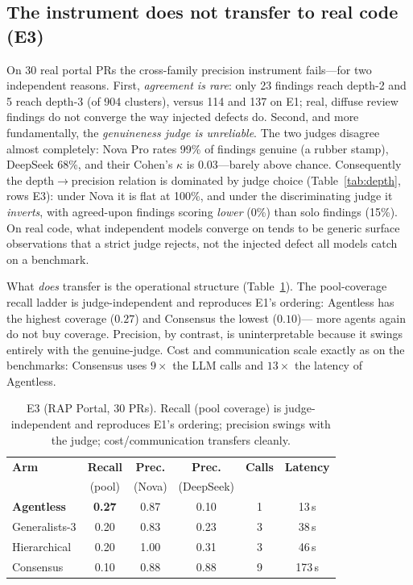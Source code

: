 \documentclass[conference]{IEEEtran}
\begin{document}
\subsection{The instrument does not transfer to real code (E3)}
On 30 real portal PRs the cross-family precision instrument fails---for two
independent reasons. First, \emph{agreement is rare}: only 23 findings reach
depth-2 and 5 reach depth-3 (of 904 clusters), versus 114 and 137 on E1; real,
diffuse review findings do not converge the way injected defects do. Second, and
more fundamentally, the \emph{genuineness judge is unreliable}. The two judges
disagree almost completely: Nova Pro rates 99\% of findings genuine (a rubber
stamp), DeepSeek 68\%, and their Cohen's $\kappa$ is $0.03$---barely above
chance. Consequently the depth$\rightarrow$precision relation is dominated by
judge choice (Table~\ref{tab:depth}, rows E3): under Nova it is flat at 100\%,
and under the discriminating judge it \emph{inverts}, with agreed-upon findings
scoring \emph{lower} (0\%) than solo findings (15\%). On real code, what
independent models converge on tends to be generic surface observations that a
strict judge rejects, not the injected defect all models catch on a benchmark.

What \emph{does} transfer is the operational structure (Table~\ref{tab:e3}). The
pool-coverage recall ladder is judge-independent and reproduces E1's ordering:
Agentless has the highest coverage ($0.27$) and Consensus the lowest ($0.10$)---
more agents again do not buy coverage. Precision, by contrast, is uninterpretable
because it swings entirely with the genuine-judge. Cost and communication scale
exactly as on the benchmarks: Consensus uses $9\times$ the LLM calls and
$13\times$ the latency of Agentless.

\begin{table}[t]
\caption{E3 (RAP Portal, 30 PRs). Recall (pool coverage) is judge-independent and
reproduces E1's ordering; precision swings with the judge; cost/communication
transfers cleanly.}
\label{tab:e3}
\centering
\small
\begin{tabular}{@{}lccccc@{}}
\toprule
\textbf{Arm} & \textbf{Recall} & \textbf{Prec.} & \textbf{Prec.} & \textbf{Calls} & \textbf{Latency} \\
 & (pool) & (Nova) & (DeepSeek) & & \\
\midrule
\textbf{Agentless} & \textbf{0.27} & 0.87 & 0.10 & 1 & 13\,s \\
Generalists-3 & 0.20 & 0.83 & 0.23 & 3 & 38\,s \\
Hierarchical  & 0.20 & 1.00 & 0.31 & 3 & 46\,s \\
Consensus     & 0.10 & 0.88 & 0.88 & 9 & 173\,s \\
\bottomrule
\end{tabular}
\end{table}
\end{document}
